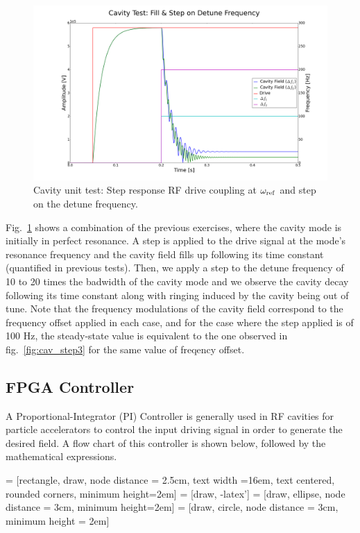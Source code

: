 \documentclass[a4paper,12pt]{article}
\begin{document}
\begin{figure}
\centering
\includegraphics[scale=0.27]{../figures/cavity_test_detune.png}
\caption{Cavity unit test: Step response RF drive coupling at $\omega_{\rm ref}$ and step on the detune frequency.}
\label{fig:cav_step4}
\end{figure}

Fig.~\ref{fig:cav_step4} shows a combination of the previous exercises, where the cavity mode is initially in perfect resonance. A step is applied to the drive signal at the mode's resonance frequency and the cavity field fills up following its time constant (quantified in previous tests). Then, we apply a step to the detune frequency of 10 to 20 times the badwidth of the cavity mode and we observe the cavity decay following its time constant along with ringing induced by the cavity being out of tune. Note that the frequency modulations of the cavity field correspond to the frequency offset applied in each case, and for the case where the step applied is of 100 Hz, the steady-state value is equivalent to the one observed in fig.~\ref{fig:cav_step3} for the same value of freqency offset.

\subsection{FPGA Controller}

A Proportional-Integrator (PI) Controller is generally used in RF cavities for particle accelerators to control the input driving signal in order to generate the desired field. A flow chart of this controller is shown below, followed by the mathematical expressions. 

 = [rectangle, draw, node distance = 2.5cm, text width =16em, text centered, rounded corners, minimum height=2em]
 = [draw, -latex']
 = [draw, ellipse,  node distance = 3cm, minimum height=2em]
 = [draw, circle, node distance = 3cm, minimum height = 2em]
\end{document}
